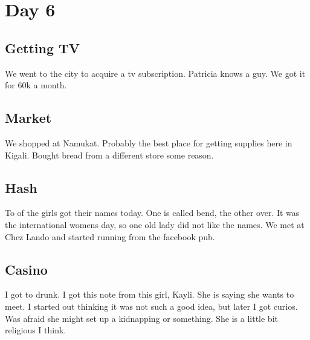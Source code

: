\section{Day 6}
\subsection{Getting TV}
We went to the city to acquire a tv subscription.
Patricia knows a guy. We got it for 60k a month.

\subsection{Market}
We shopped at Namukat. Probably the best place for getting supplies here in Kigali.
Bought bread from a different store some reason.

\subsection{Hash}
To of the girls got their names today. One is called bend, the other over.
It was the international womens day, so one old lady did not like the names.
We met at Chez Lando and started running from the facebook pub.

\subsection{Casino}
I got to drunk. I got this note from this girl, Kayli. She is saying she wants to meet.
I started out thinking it was not such a good idea, but later I got curios.
Was afraid she might set up a kidnapping or something.
She is a little bit religious I think.
